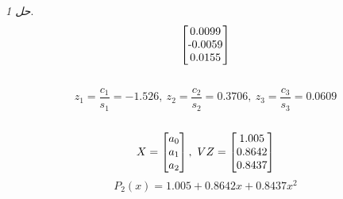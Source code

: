 \documentclass{article}
\theoremstyle{remark}		%
\newtheorem*{varsol}{حل}
\begin{document}
\begin{varsol}
\[\begin{bmatrix}
	$0.0099$ \\
	$-0.0059$ \\ 
	$0.0155$
\end{bmatrix}
\]
\\
\[
z_1 = \frac{c_1}{s_1}  = -1.526 , \ z_2 = \frac{c_2}{s_2}  = 0.3706 , \ z_3 = \frac{c_3}{s_3}  = 0.0609
\]
\\
\[
X = 
\begin{bmatrix}
	a_0 \\
	a_1 \\
	a_2
\end{bmatrix}, \ VZ =  
\begin{bmatrix}
	$1.005$ \\
	$0.8642$ \\
	$0.8437$
\end{bmatrix}
\]
\[
P_2(x)  =  1.005 + 0.8642x + 0.8437x^2
\]
	\end{varsol}
\end{document}
